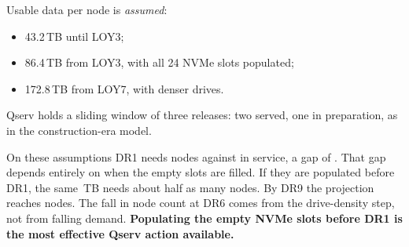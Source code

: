Usable data per node is \emph{assumed}:
\begin{itemize}
\item 43.2\,TB until LOY3;
\item 86.4\,TB from LOY3, with all 24 NVMe slots populated;
\item 172.8\,TB from LOY7, with denser drives.
\end{itemize}
Qserv holds a sliding window of three releases: two served, one in
preparation, as in the construction-era model.

On these assumptions DR1 needs \smQsDRoneNodes{} nodes against
\smQsNodesHave{} in service, a gap of \smQsDRoneGap{}. That gap depends
entirely on when the empty slots are filled. If they are populated before DR1,
the same \smQsDRoneWindowTB{}\,TB needs about half as many nodes. By DR9 the
projection reaches \smQsDRnineNodes{} nodes. The fall in node count at DR6
comes from the drive-density step, not from falling demand.
\textbf{Populating the empty NVMe slots before DR1 is the most effective Qserv
action available.}



\begin{landscape}

\end{landscape}
